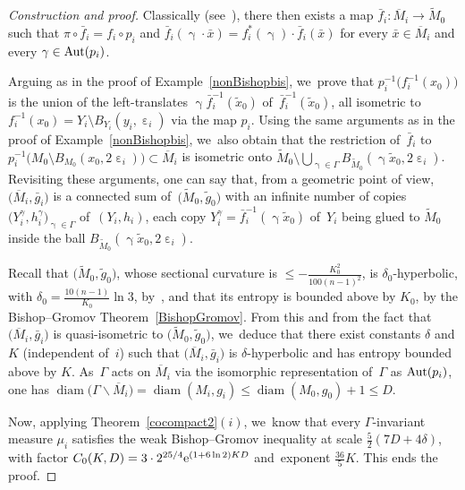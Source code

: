 \documentclass[pdftex]{sigma}
\numberwithin{equation}{section}
\newcommand{\f}{\rightarrow}
\newcommand{\diam}{\operatorname{diam}}
\newcommand{\g}{\operatorname{\gamma}}
\newcommand{\e}{\operatorname{\varepsilon}}
\begin{document}
\begin{proof}[Construction and proof]
Classically (see~\cite[Theorem~(6.1)]{GrH}), there then exists a map $\bar f_i \colon \overline M_i \f \widetilde M_0$ such that $\pi \circ \bar f_i =
f_i \circ p_i$
and $ \bar f_i (\g\cdot \bar x) = f_i^* (\g) \cdot \bar f_i (\bar x)$ for every $\bar x \in \overline M_i$ and every $\g \in {\rm Aut} (p_i)$.

Arguing as in the proof of Example~\ref{nonBishopbis}, we~prove that $p_i^{-1} \big( f_i^{-1} (x_0)\big)$ is the union of the left-translates
$ \g \bar f_i^{-1} ( \tilde x_0) $ of~$\bar f_i^{-1} ( \tilde x_0) $, all
isometric to $ f_i^{-1} (x_0) = Y_i \setminus B_{Y_i} (y_i, \e_i) $ via the map $p_i$.
Using the same arguments as in the proof of Example~\ref{nonBishopbis}, we~also obtain that the restriction of~$\bar f_i$ to
$p_i^{-1} \big( M_0 \setminus B_{M_0} (x_0, 2 \e_i)\big) \subset \overline M_i$ is isometric onto $\widetilde M_0 \setminus \bigcup_{\g \in \Gamma} B_{\widetilde M_0} (\g \tilde x_0, 2 \e_i)$.
Revisiting these arguments, one can say that, from a geometric point of view, $\big(\overline M_i, \bar g_i\big)$ is a connected sum of~$\big(\widetilde M_0, \tilde g_0\big)$ with an infinite
number of copies $\big(Y_i^\gamma, h_i^\gamma\big)_{\g \in \Gamma}$ of~$(Y_i, h_i)$, each copy $Y_i^\gamma = \bar f_i^{-1} (\g \tilde x_0) $ of~$Y_i$ being glued
to $\widetilde M_0$ inside
the ball $B_{\widetilde M_0} (\g \tilde x_0, 2 \e_i)$.

Recall that $\big(\widetilde M_0, \tilde g_0\big)$, whose sectional curvature is $\le - \frac{K_0^2}{100 (n-1)^2}$, is $\delta_0$-hyperbolic, with $\delta_0 =
\frac{10 (n-1)}{K_0} \ln 3 $, by~\cite[Proposition~1.4.3, p.~12]{CDP}, and that its entropy is bounded above by $K_0$, by the Bishop--Gromov Theorem~\ref{BishopGromov}. From this and from the fact that $\big(\overline M_i, \bar g_i\big)$ is quasi-isometric to $\big(\widetilde M_0, \tilde g_0\big)$, we~deduce that
there exist constants $\delta$ and $K$ (independent of~$i$) such that $\big(\overline M_i, \bar g_i\big)$ is $\delta$-hyperbolic and has entropy bounded
above by $K$. As~$\Gamma$ acts on $\overline M_i$ via the isomorphic representation of~$\Gamma$ as ${\rm Aut} (p_i)$, one has
$\diam \big(\Gamma \backslash \overline M_i\big) = \diam (M_i,g_i) \le \diam (M_0, g_0) + 1 \le D $.

Now, applying Theorem~\ref{cocompact2}$(i)$, we~know that every $\Gamma$-invariant measure $\mu_i$ satisfies the
weak Bishop--Gromov inequality at scale $\frac{5}{2} (7 D + 4 \delta)$, with factor $ C_0 (K, D) = 3\cdot 2^{25/4} {\rm e}^{(1+ 6 \ln 2) K D}$ and~exponent
$\frac{36}{5} K$. This ends the proof.
\end{proof}
\end{document}
